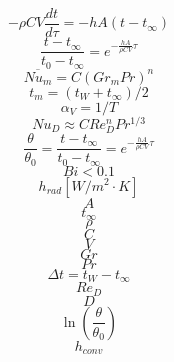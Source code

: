 $$ - \rho C V \frac{dt}{d\tau} = -hA(t - t_{\infty}) $$ 
$$ \frac{t - t_{\infty}}{t_0 - t_{\infty}} = e^{-\frac{hA}{\rho CV}\tau} $$
$$ \overline{Nu_m} = C(Gr_m Pr)^n $$
$$ t_m = (t_W + t_{\infty})/2 $$
$$ \alpha_V = 1/T $$
$$ Nu_D \approx C Re_D^n Pr^{1/3} $$
$$ \frac{\theta}{\theta_0} = \frac{t - t_{\infty}}{t_0 - t_{\infty}} = e^{-\frac{hA}{\rho CV}\tau}$$
$$ Bi < 0.1 $$
$$ h_{rad} [W/m^2 \cdot K] $$
$$ A $$
$$ t_{\infty} $$
$$ \rho $$
$$ C $$
$$ V $$
$$ Gr $$
$$ Pr $$
$$ \Delta t = t_W - t_{\infty} $$
$$ Re_D $$
$$ D $$
$$ \ln(\frac{\theta}{\theta_0}) $$
$$ h_{conv} $$
